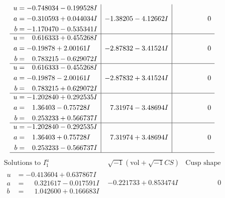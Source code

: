 \documentclass[1p]{elsarticle_modified}
\theoremstyle{definition}
\newcommand{\I}{\sqrt{-1}}
\begin{document}
$$\begin{array}{c|c|c}
\begin{aligned}
u &= -0.748034 - 0.199528 I \\
a &= -0.310593 + 0.044034 I \\
b &= -1.170470 - 0.535341 I\end{aligned}
 & -1.38205 - 4.12662 I & \phantom{-0.000000 } 0 \\ \hline\begin{aligned}
u &= \phantom{-}0.616333 + 0.455268 I \\
a &= -0.19878 + 2.00161 I \\
b &= \phantom{-}0.783215 - 0.629072 I\end{aligned}
 & -2.87832 - 3.41524 I & \phantom{-0.000000 } 0 \\ \hline\begin{aligned}
u &= \phantom{-}0.616333 - 0.455268 I \\
a &= -0.19878 - 2.00161 I \\
b &= \phantom{-}0.783215 + 0.629072 I\end{aligned}
 & -2.87832 + 3.41524 I & \phantom{-0.000000 } 0 \\ \hline\begin{aligned}
u &= -1.202840 + 0.292535 I \\
a &= \phantom{-}1.36403 - 0.75728 I \\
b &= \phantom{-}0.253233 + 0.566737 I\end{aligned}
 & \phantom{-}7.31974 - 3.48694 I & \phantom{-0.000000 } 0 \\ \hline\begin{aligned}
u &= -1.202840 - 0.292535 I \\
a &= \phantom{-}1.36403 + 0.75728 I \\
b &= \phantom{-}0.253233 - 0.566737 I\end{aligned}
 & \phantom{-}7.31974 + 3.48694 I & \phantom{-0.000000 } 0\\
 \hline 
 \end{array}$$\newpage$$\begin{array}{c|c|c}  
\text{Solutions to }I^u_{1}& \I (\text{vol} + \sqrt{-1}CS) & \text{Cusp shape}\\
 \hline 
\begin{aligned}
u &= -0.413604 + 0.637867 I \\
a &= \phantom{-}0.321617 - 0.017591 I \\
b &= \phantom{-}1.042600 + 0.166683 I\end{aligned}
 & -0.221733 + 0.853474 I & \phantom{-0.000000 } 0 \\ \hline\begin{aligned}

\end{aligned}
\end{array}$$
\end{document}
